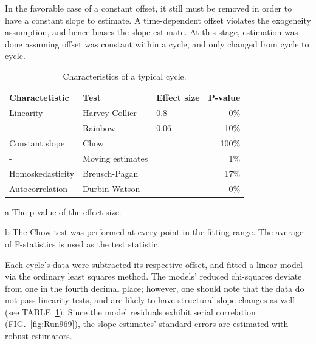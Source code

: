 \documentclass[reprint]{revtex4-1}
\begin{document}
In the favorable case of a constant offset, it still must be removed in order to have a constant slope to estimate. A time-dependent offset violates the exogeneity assumption, and hence biases the slope estimate. At this stage, estimation was done assuming offset was constant within a cycle, and only changed from cycle to cycle.


\begin{table}
\centering
\begin{threeparttable}
	\caption{Characteristics of a typical cycle.\label{tbl:CycleChars}}
	\begin{tabular}{lllr}
	\hline\hline
	Charactetistic	& Test 					& Effect size	& P-value\tnote{a}\\
	\hline
	Linearity 		& Harvey-Collier		& 0.8			& 0\% \\
	-				& Rainbow				& 0.06			& 10\% \\
	Constant slope	& Chow\tnote{b}		 	&				& 100\% \\
	-				& Moving estimates		&				& 1\% \\
	Homoskedasticity& Breusch-Pagan 		&				& 17\% \\
	Autocorrelation & Durbin-Watson			&				& 0\% \\
	\hline\hline
	\end{tabular}
	\begin{tablenotes}
		\item[a]{The p-value of the effect size.}
		\item[b]{The Chow test was performed at every point in the fitting range. The average of F-statistics is used as the test statistic.}
	\end{tablenotes}
\end{threeparttable}
\end{table}

Each cycle's data were subtracted its respective offset, and fitted a linear model via the ordinary least squares method. The models' reduced chi-squares deviate from one in the fourth decimal place; however, one should note that the data do not pass linearity tests, and are likely to have structural slope changes as well (see TABLE~\ref{tbl:CycleChars}). Since the model residuals exhibit serial correlation (FIG.~\ref{fig:Run969}), the slope estimates' standard errors are estimated with robust estimators.
\end{document}

